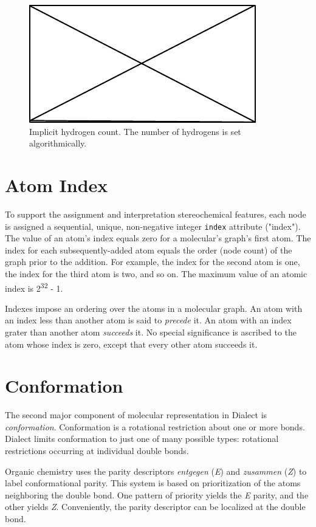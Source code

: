 \documentclass{article}
\def\ttt{\texttt}
\begin{document}
\begin{figure}
    \centering
    \includegraphics{filler}
    \caption{Implicit hydrogen count. The number of hydrogens is set algorithmically.}
    \label{fig:implicit-hydrogen-count}
\end{figure}

\section*{Atom Index}

To support the assignment and interpretation stereochemical features, each node is assigned a sequential, unique, non-negative integer \ttt{index} attribute ("index"). The value of an atom's index equals zero for a molecular's graph's first atom. The index for each subsequently-added atom equals the order (node count) of the graph prior to the addition. For example, the index for the second atom is one, the index for the third atom is two, and so on. The maximum value of an atomic index is 2\textsuperscript{32} - 1.

Indexes impose an ordering over the atoms in a molecular graph. An atom with an index less than another atom is said to \textit{precede} it. An atom with an index grater than another atom \textit{succeeds} it. No special significance is ascribed to the atom whose index is zero, except that every other atom succeeds it.

\section*{Conformation}

The second major component of molecular representation in Dialect is \textit{conformation}. Conformation is a rotational restriction about one or more bonds. Dialect limits conformation to just one of many possible types: rotational restrictions occurring at individual double bonds.

Organic chemistry uses the parity descriptors \textit{entgegen} (\textit{E}) and \textit{zusammen} (\textit{Z}) to label conformational parity. This system is based on prioritization of the atoms neighboring the double bond. One pattern of priority yields the \textit{E} parity, and the other yields \textit{Z}. Conveniently, the parity descriptor can be localized at the double bond.
\end{document}
